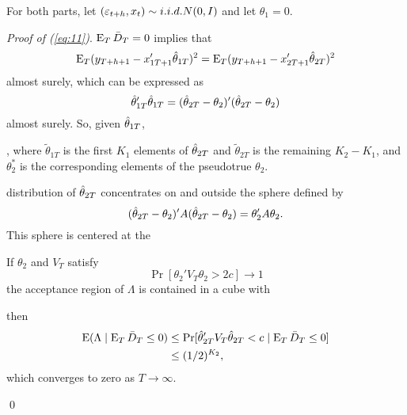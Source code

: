 \documentclass[12pt]{article}
\begin{document}
For both parts, let $(\varepsilon_{t+h}, x_{t}) \sim i.i.d. N(0,I)$ and let
$\theta_1 = 0$.

\noindent
\emph{Proof of (\ref{eq:11})}. $\operatorname{E}_T \bar{D}_{T} = 0$ implies that
\begin{equation*}
  \operatorname{E}_T (y_{T+h+1} - x_{1T+1}'\hat\theta_{1T})^2
  = \operatorname{E}_T (y_{T+h+1} - x_{2T+1}'\hat\theta_{2T})^2
\end{equation*}
almost surely, which can be expressed as
\begin{equation*}
  \hat\theta_{1T}'\hat\theta_{1T} = (\hat\theta_{2T} - \theta_2)'(\hat\theta_{2T} - \theta_2)
\end{equation*}
almost surely. So, given $\hat\theta_{1T}$,

, where $\tilde\theta_{1T}$ is the first $K_1$ elements
of $\hat\theta_{2T}$ and $\tilde\theta_{2T}$ is the remaining $K_2 - K_1$, and
$\theta_2^*$ is the corresponding elements of the pseudotrue $\theta_2$.


distribution of $\hat\theta_{2T}$ concentrates on and outside the sphere
defined by
\begin{equation*}
  (\hat\theta_{2T} - \theta_2)' A (\hat\theta_{2T} - \theta_2) = \theta_2' A \theta_2.
\end{equation*}
This sphere is centered at the

If $\theta_2$ and $V_T$ satisfy
\begin{equation*}
  \Pr[\theta_2' V_T \theta_2 > 2 c] \to 1
\end{equation*}
the acceptance region of $\Lambda$ is contained in a cube with

then
\begin{align*}
  \operatorname{E}(\Lambda \mid \operatorname{E}_T \bar{D}_{T} \leq 0)
  &\leq \Pr[ \hat\theta_{2T}' V_T \hat\theta_{2T} < c \mid \operatorname{E}_T \bar{D}_{T} \leq 0] \\
  &\leq (1/2)^{K_2},
\end{align*}
which converges to zero as $T \to \infty$.

\qed



\end{document}
